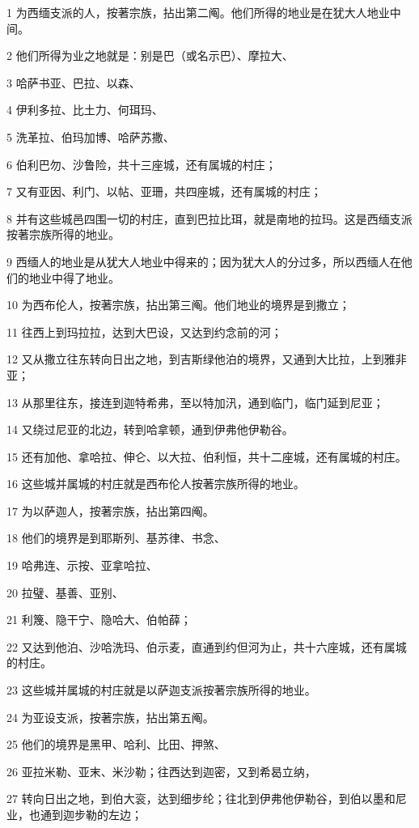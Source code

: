 \par 1 为西缅支派的人，按著宗族，拈出第二阄。他们所得的地业是在犹大人地业中间。
\par 2 他们所得为业之地就是：别是巴（或名示巴）、摩拉大、
\par 3 哈萨书亚、巴拉、以森、
\par 4 伊利多拉、比土力、何珥玛、
\par 5 洗革拉、伯玛加博、哈萨苏撒、
\par 6 伯利巴勿、沙鲁险，共十三座城，还有属城的村庄；
\par 7 又有亚因、利门、以帖、亚珊，共四座城，还有属城的村庄；
\par 8 并有这些城邑四围一切的村庄，直到巴拉比珥，就是南地的拉玛。这是西缅支派按著宗族所得的地业。
\par 9 西缅人的地业是从犹大人地业中得来的；因为犹大人的分过多，所以西缅人在他们的地业中得了地业。
\par 10 为西布伦人，按著宗族，拈出第三阄。他们地业的境界是到撒立；
\par 11 往西上到玛拉拉，达到大巴设，又达到约念前的河；
\par 12 又从撒立往东转向日出之地，到吉斯绿他泊的境界，又通到大比拉，上到雅非亚；
\par 13 从那里往东，接连到迦特希弗，至以特加汛，通到临门，临门延到尼亚；
\par 14 又绕过尼亚的北边，转到哈拿顿，通到伊弗他伊勒谷。
\par 15 还有加他、拿哈拉、伸仑、以大拉、伯利恒，共十二座城，还有属城的村庄。
\par 16 这些城并属城的村庄就是西布伦人按著宗族所得的地业。
\par 17 为以萨迦人，按著宗族，拈出第四阄。
\par 18 他们的境界是到耶斯列、基苏律、书念、
\par 19 哈弗连、示按、亚拿哈拉、
\par 20 拉璧、基善、亚别、
\par 21 利篾、隐干宁、隐哈大、伯帕薛；
\par 22 又达到他泊、沙哈洗玛、伯示麦，直通到约但河为止，共十六座城，还有属城的村庄。
\par 23 这些城并属城的村庄就是以萨迦支派按著宗族所得的地业。
\par 24 为亚设支派，按著宗族，拈出第五阄。
\par 25 他们的境界是黑甲、哈利、比田、押煞、
\par 26 亚拉米勒、亚末、米沙勒；往西达到迦密，又到希曷立纳，
\par 27 转向日出之地，到伯大衮，达到细步纶；往北到伊弗他伊勒谷，到伯以墨和尼业，也通到迦步勒的左边；
